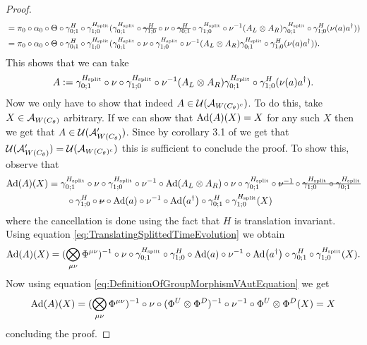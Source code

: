 \documentclass[11pt,a4paper,twoside]{article}
\numberwithin{equation}{section}
\begin{document}
\begin{proof}
\begin{align}
			&=\pi_0\circ\alpha_0\circ\Theta\circ\gamma^H_{0;1}\circ\gamma^{\Hsplit}_{1;0}(\gamma^{\Hsplit}_{0;1}\circ\stkout{\gamma^H_{1;0}}\circ\nu\circ\stkout{\gamma^H_{0;1}}\circ\gamma^{\Hsplit}_{1;0}\circ\nu^{-1}(A_L\otimes A_R)\gamma^{\Hsplit}_{0;1}\circ\gamma^H_{1;0}(\nu(a)a^\dagger))\\
			&=\pi_0\circ\alpha_0\circ\Theta\circ\gamma^H_{0;1}\circ\gamma^{\Hsplit}_{1;0}(\gamma^{\Hsplit}_{0;1}\circ\nu\circ\gamma^{\Hsplit}_{1;0}\circ\nu^{-1}(A_L\otimes A_R)\gamma^{\Hsplit}_{0;1}\circ\gamma^H_{1;0}(\nu(a)a^\dagger)).
		\end{align}
		This shows that we can take
		\begin{equation}
			A\defeq \gamma^{\Hsplit}_{0;1}\circ\nu\circ\gamma^{\Hsplit}_{1;0}\circ\nu^{-1}(A_L\otimes A_R)\gamma^{\Hsplit}_{0;1}\circ\gamma^H_{1;0}(\nu(a)a^\dagger).
		\end{equation}
		Now we only have to show that indeed $A\in\UU(\AA_{W(C_\theta)^c})$. To do this, take $X\in\AA_{W(C_\theta)}$ arbitrary. If we can show that $\Ad{A}(X)=X$ for any such $X$ then we get that $A\in\UU(\AA_{W(C_\theta)}')$. Since by corollary 3.1 of \cite{NaScWe_2013} we get that $\UU(\AA_{W(C_\theta)}')=\UU(\AA_{W(C_\theta)^c})$ this is sufficient to conclude the proof. To show this, observe that
		\begin{align}
			\Ad{A}(X)&=\gamma^{\Hsplit}_{0;1}\circ\nu\circ\gamma^{\Hsplit}_{1;0}\circ\nu^{-1}\circ\Ad{A_L\otimes A_R}\circ\nu\circ\gamma^{\Hsplit}_{0;1}\circ\stkout{\nu^{-1}}\circ\stkout{\gamma^{\Hsplit}_{1;0}\circ\gamma^{\Hsplit}_{0;1}}\\
			&\nonumber
			\qquad\circ\gamma^H_{1;0}\circ\stkout{\nu}\circ\Ad{a}\circ\nu^{-1}\circ\Ad{a^\dagger}\circ\gamma^H_{0;1}\circ\gamma^{\Hsplit}_{1;0}(X)
		\end{align}
		where the cancellation is done using the fact that $H$ is translation invariant. Using equation \eqref{eq:TranslatingSplittedTimeEvolution} we obtain
		\begin{equation}
			\Ad{A}(X)=(\bigotimes_{\mu\nu}\Phi^{\mu\nu})^{-1}\circ\nu\circ\gamma^{\Hsplit}_{0;1}\circ\gamma^H_{1;0}\circ\Ad{a}\circ\nu^{-1}\circ\Ad{a^\dagger}\circ\gamma^H_{0;1}\circ\gamma^{\Hsplit}_{1;0}(X).
		\end{equation}
		Now using equation \eqref{eq:DefinitionOfGroupMorphismVAutEquation} we get
		\begin{equation}
			\Ad{A}(X)=(\bigotimes_{\mu\nu}\Phi^{\mu\nu})^{-1}\circ\nu\circ(\Phi^U\otimes\Phi^D)^{-1}\circ\nu^{-1}\circ\Phi^U\otimes\Phi^D(X)=X
		\end{equation}
		concluding the proof.
	\end{proof}
\end{document}
